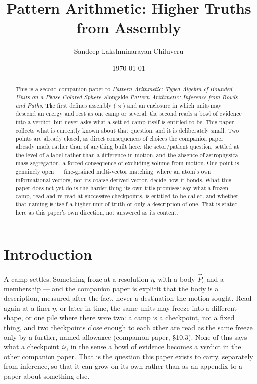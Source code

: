 \documentclass[12pt, a4paper]{article}
\title{Pattern Arithmetic: Higher Truths from Assembly}
\author{Sandeep Lakshminarayan Chiluveru}
\date{\today}
\begin{document}
\maketitle

\begin{abstract}
This is a second companion paper to \emph{Pattern Arithmetic: Typed
Algebra of Bounded Units on a Phase-Colored Sphere}, alongside
\emph{Pattern Arithmetic: Inference from Bowls and Paths}. The first
defines assembly ($\bowtie$) and an enclosure in which units may
descend an energy and rest as one camp or several; the second reads
a bowl of evidence into a verdict, but never asks what a settled
camp itself is entitled to be. This paper collects what is currently
known about that question, and it is deliberately small. Two points
are already closed, as direct consequences of choices the companion
paper already made rather than of anything built here: the
actor/patient question, settled at the level of a label rather than
a difference in motion, and the absence of astrophysical mass
segregation, a forced consequence of excluding volume from motion.
One point is genuinely open --- fine-grained multi-vector matching,
where an atom's own informational vectors, not its coarse derived vector, decide how it bonds. What this paper does not yet do is the harder thing
its own title promises: say what a frozen camp, read and re-read at
successive checkpoints, is entitled to be called, and whether that
naming is itself a higher unit of truth or only a description of
one. That is stated here as this paper's own direction, not
answered as its content.
\end{abstract}

\section{Introduction}
\label{sec:intro}

A camp settles. Something froze at a resolution $\eta$, with a body
$\vec P_{c}$ and a membership --- and the companion paper is
explicit that the body is a description, measured after the fact,
never a destination the motion sought. Read again at a finer $\eta$,
or later in time, the same units may freeze into a different shape,
or one pile where there were two: a camp is a checkpoint, not a
fixed thing, and two checkpoints close enough to each other are
read as the same freeze only by a further, named allowance
(companion paper, \S10.3). None of this says what a checkpoint
\emph{is}, in the sense a bowl of evidence becomes a verdict in the
other companion paper. That is the question this paper exists to
carry, separately from inference, so that it can grow on its own
rather than as an appendix to a paper about something else.
\end{document}
